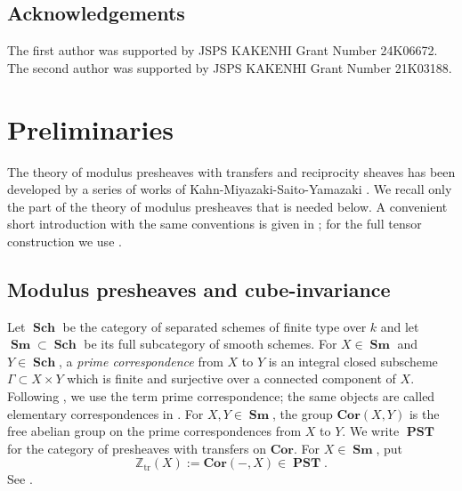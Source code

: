 \documentclass[a4paper,12pt,reqno]{amsart}
\numberwithin{equation}{section}
\theoremstyle{definition}
\newcommand{\Z}{\mathbb{Z}}
\newcommand{\PST}{\operatorname{\mathbf{PST}}}
\newcommand{\Sch}{\operatorname{\mathbf{Sch}}}
\newcommand{\Sm}{\operatorname{\mathbf{Sm}}}
\newcommand{\Cork}{\mathbf{Cor}}
\newcommand{\Ztr}{\Z_{\mathrm{tr}}}
\begin{document}
\subsection*{Acknowledgements}
The first author was supported by JSPS KAKENHI Grant Number 24K06672.
The second author was supported by JSPS KAKENHI Grant Number 21K03188.





\section{Preliminaries}\label{sec:prelim}
The theory of modulus presheaves with transfers and reciprocity sheaves has been developed by a series of works of Kahn-Miyazaki-Saito-Yamazaki \cite{KSY16, KSY22, KMSY1, KMSY2}.
We recall only the part of the theory of modulus presheaves that is needed
below.  A convenient short introduction with the same conventions is given
in \cite[Section~5, especially Definitions~5.1--5.7]{HS25}; for the full
tensor construction we use \cite[Sections~2--4]{RSY22}.


\subsection{Modulus presheaves and cube-invariance}
Let $\Sch$ be the category of separated schemes of finite type over $k$
and let $\Sm\subset\Sch$ be its full subcategory of smooth schemes.  For
$X\in\Sm$ and $Y\in\Sch$, a \emph{prime correspondence} from $X$ to $Y$
is an integral closed subscheme $\Gamma\subset X\times Y$ which is finite
and surjective over a connected component of $X$.  Following
\cite[Section~2.1]{RSY22}, we use the term prime correspondence; the same
objects are called elementary correspondences in
\cite[Definition~1.1]{MVW06}.  For $X,Y\in\Sm$, the group
$\Cork(X,Y)$ is the free abelian group on the prime correspondences from
$X$ to $Y$.  We write $\PST$ for the category of presheaves with transfers
on $\Cork$.  For $X\in\Sm$, put
\begin{equation}\label{eq:ZtrSm}
 \Ztr(X):=\Cork(-,X)\in\PST.
\end{equation}
See \cite[Sections~1.2 and~2.1]{RSY22}.
\end{document}
